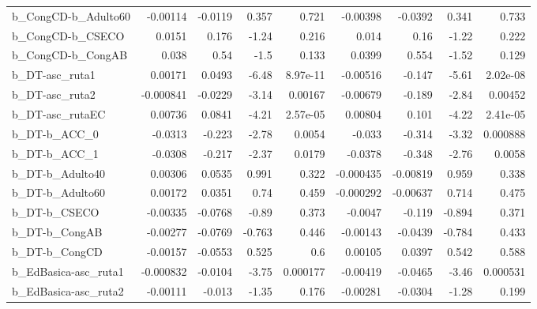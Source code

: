 \begin{tabular}{lrrrrrrrr}
b\_CongCD-b\_Adulto60        &    -0.00114 &      -0.0119 &    0.357 &    0.721 &   -0.00398 &     -0.0392 &        0.341 &         0.733 \\
b\_CongCD-b\_CSECO           &      0.0151 &        0.176 &    -1.24 &    0.216 &      0.014 &        0.16 &        -1.22 &         0.222 \\
b\_CongCD-b\_CongAB          &       0.038 &         0.54 &     -1.5 &    0.133 &     0.0399 &       0.554 &        -1.52 &         0.129 \\
b\_DT-asc\_ruta1             &     0.00171 &       0.0493 &    -6.48 & 8.97e-11 &   -0.00516 &      -0.147 &        -5.61 &      2.02e-08 \\
b\_DT-asc\_ruta2             &   -0.000841 &      -0.0229 &    -3.14 &  0.00167 &   -0.00679 &      -0.189 &        -2.84 &       0.00452 \\
b\_DT-asc\_rutaEC            &     0.00736 &       0.0841 &    -4.21 & 2.57e-05 &    0.00804 &       0.101 &        -4.22 &      2.41e-05 \\
b\_DT-b\_ACC\_0               &     -0.0313 &       -0.223 &    -2.78 &   0.0054 &     -0.033 &      -0.314 &        -3.32 &      0.000888 \\
b\_DT-b\_ACC\_1               &     -0.0308 &       -0.217 &    -2.37 &   0.0179 &    -0.0378 &      -0.348 &        -2.76 &        0.0058 \\
b\_DT-b\_Adulto40            &     0.00306 &       0.0535 &    0.991 &    0.322 &  -0.000435 &    -0.00819 &        0.959 &         0.338 \\
b\_DT-b\_Adulto60            &     0.00172 &       0.0351 &     0.74 &    0.459 &  -0.000292 &    -0.00637 &        0.714 &         0.475 \\
b\_DT-b\_CSECO               &    -0.00335 &      -0.0768 &    -0.89 &    0.373 &    -0.0047 &      -0.119 &       -0.894 &         0.371 \\
b\_DT-b\_CongAB              &    -0.00277 &      -0.0769 &   -0.763 &    0.446 &   -0.00143 &     -0.0439 &       -0.784 &         0.433 \\
b\_DT-b\_CongCD              &    -0.00157 &      -0.0553 &    0.525 &      0.6 &    0.00105 &      0.0397 &        0.542 &         0.588 \\
b\_EdBasica-asc\_ruta1       &   -0.000832 &      -0.0104 &    -3.75 & 0.000177 &   -0.00419 &     -0.0465 &        -3.46 &      0.000531 \\
b\_EdBasica-asc\_ruta2       &    -0.00111 &       -0.013 &    -1.35 &    0.176 &   -0.00281 &     -0.0304 &        -1.28 &         0.199 \\

\end{tabular}
